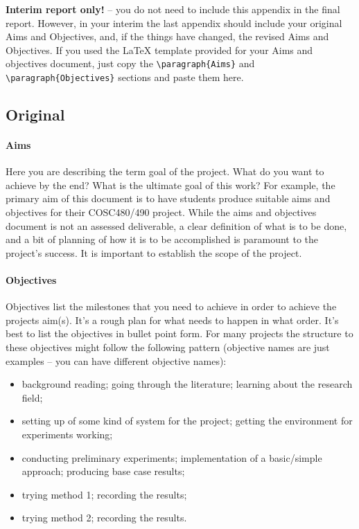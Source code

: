 \documentclass[12pt]{article}
\begin{document}
\textbf{Interim report only!} -- you do not need to include this appendix in the final report.  However, in your interim the last appendix should include your original Aims and Objectives, and, if the things have changed, the revised Aims and Objectives. If you used the \LaTeX{} template provided for your Aims and objectives document, just copy the \verb$\paragraph{Aims}$ and \verb$\paragraph{Objectives}$ sections and paste them here.

\subsection*{Original}

\paragraph{Aims}
Here you are describing the term goal of the project. What do you want to achieve by the end?  What is the ultimate goal of this work?  For example, the primary aim of this document is to have students produce suitable aims and objectives for their COSC480/490 project. While the aims and objectives document is not an assessed deliverable, a clear definition of what is to be done, and a bit of planning of how it is to be accomplished is paramount to the project's success. It is important to establish the scope of the project.

\paragraph{Objectives}
Objectives list the milestones that you need to achieve in order to achieve the projects aim(s). It's a rough plan for what needs to happen in what order. It's best to list the objectives in bullet point form. For many projects the structure to these objectives might follow the following pattern (objective names are just examples -- you can have different objective names):    
\begin{itemize}[noitemsep]
\item background reading; going through the literature; learning about the research field;
\item setting up of some kind of system for the project; getting the environment for experiments working;
\item conducting preliminary experiments; implementation of a basic/simple approach; producing base case results;
\item trying method 1; recording the results;
\item trying method 2; recording the results.
\end{itemize}
\end{document}
